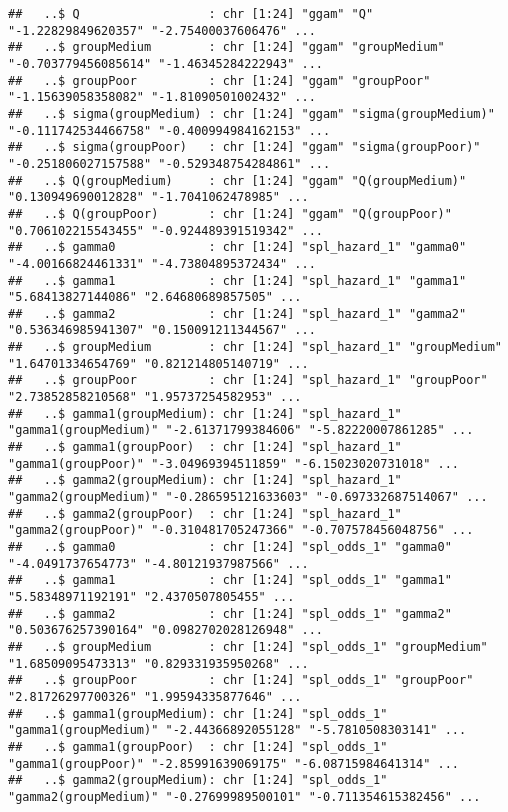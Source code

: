 \documentclass[
]{article}
\begin{document}
\begin{verbatim}
##   ..$ Q                  : chr [1:24] "ggam" "Q" "-1.22829849620357" "-2.75400037606476" ...
##   ..$ groupMedium        : chr [1:24] "ggam" "groupMedium" "-0.703779456085614" "-1.46345284222943" ...
##   ..$ groupPoor          : chr [1:24] "ggam" "groupPoor" "-1.15639058358082" "-1.81090501002432" ...
##   ..$ sigma(groupMedium) : chr [1:24] "ggam" "sigma(groupMedium)" "-0.111742534466758" "-0.400994984162153" ...
##   ..$ sigma(groupPoor)   : chr [1:24] "ggam" "sigma(groupPoor)" "-0.251806027157588" "-0.529348754284861" ...
##   ..$ Q(groupMedium)     : chr [1:24] "ggam" "Q(groupMedium)" "0.130949690012828" "-1.7041062478985" ...
##   ..$ Q(groupPoor)       : chr [1:24] "ggam" "Q(groupPoor)" "0.706102215543455" "-0.924489391519342" ...
##   ..$ gamma0             : chr [1:24] "spl_hazard_1" "gamma0" "-4.00166824461331" "-4.73804895372434" ...
##   ..$ gamma1             : chr [1:24] "spl_hazard_1" "gamma1" "5.68413827144086" "2.64680689857505" ...
##   ..$ gamma2             : chr [1:24] "spl_hazard_1" "gamma2" "0.536346985941307" "0.150091211344567" ...
##   ..$ groupMedium        : chr [1:24] "spl_hazard_1" "groupMedium" "1.64701334654769" "0.821214805140719" ...
##   ..$ groupPoor          : chr [1:24] "spl_hazard_1" "groupPoor" "2.73852858210568" "1.95737254582953" ...
##   ..$ gamma1(groupMedium): chr [1:24] "spl_hazard_1" "gamma1(groupMedium)" "-2.61371799384606" "-5.82220007861285" ...
##   ..$ gamma1(groupPoor)  : chr [1:24] "spl_hazard_1" "gamma1(groupPoor)" "-3.04969394511859" "-6.15023020731018" ...
##   ..$ gamma2(groupMedium): chr [1:24] "spl_hazard_1" "gamma2(groupMedium)" "-0.286595121633603" "-0.697332687514067" ...
##   ..$ gamma2(groupPoor)  : chr [1:24] "spl_hazard_1" "gamma2(groupPoor)" "-0.310481705247366" "-0.707578456048756" ...
##   ..$ gamma0             : chr [1:24] "spl_odds_1" "gamma0" "-4.0491737654773" "-4.80121937987566" ...
##   ..$ gamma1             : chr [1:24] "spl_odds_1" "gamma1" "5.58348971192191" "2.4370507805455" ...
##   ..$ gamma2             : chr [1:24] "spl_odds_1" "gamma2" "0.503676257390164" "0.0982702028126948" ...
##   ..$ groupMedium        : chr [1:24] "spl_odds_1" "groupMedium" "1.68509095473313" "0.829331935950268" ...
##   ..$ groupPoor          : chr [1:24] "spl_odds_1" "groupPoor" "2.81726297700326" "1.99594335877646" ...
##   ..$ gamma1(groupMedium): chr [1:24] "spl_odds_1" "gamma1(groupMedium)" "-2.44366892055128" "-5.7810508303141" ...
##   ..$ gamma1(groupPoor)  : chr [1:24] "spl_odds_1" "gamma1(groupPoor)" "-2.85991639069175" "-6.08715984641314" ...
##   ..$ gamma2(groupMedium): chr [1:24] "spl_odds_1" "gamma2(groupMedium)" "-0.27699989500101" "-0.711354615382456" ...

\end{verbatim}
\end{document}
